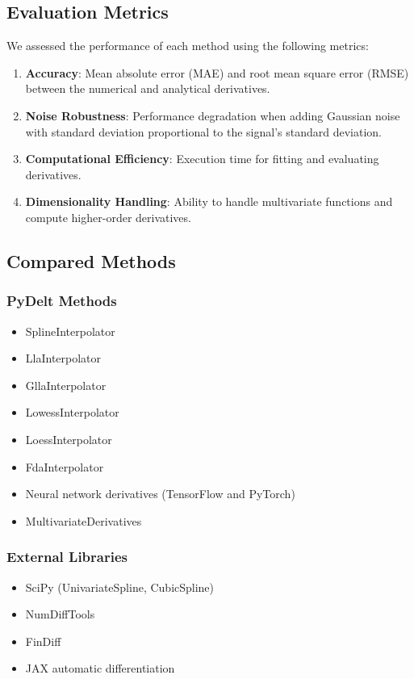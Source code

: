 \documentclass[conference]{IEEEtran}
\begin{document}
\subsection{Evaluation Metrics}
We assessed the performance of each method using the following metrics:

\begin{enumerate}
\item \textbf{Accuracy}: Mean absolute error (MAE) and root mean square error (RMSE) between the numerical and analytical derivatives.

\item \textbf{Noise Robustness}: Performance degradation when adding Gaussian noise with standard deviation proportional to the signal's standard deviation.

\item \textbf{Computational Efficiency}: Execution time for fitting and evaluating derivatives.

\item \textbf{Dimensionality Handling}: Ability to handle multivariate functions and compute higher-order derivatives.
\end{enumerate}

\subsection{Compared Methods}

\subsubsection{PyDelt Methods}
\begin{itemize}
\item SplineInterpolator
\item LlaInterpolator
\item GllaInterpolator
\item LowessInterpolator
\item LoessInterpolator
\item FdaInterpolator
\item Neural network derivatives (TensorFlow and PyTorch)
\item MultivariateDerivatives
\end{itemize}

\subsubsection{External Libraries}
\begin{itemize}
\item SciPy (UnivariateSpline, CubicSpline)
\item NumDiffTools
\item FinDiff
\item JAX automatic differentiation
\end{itemize}
\end{document}
